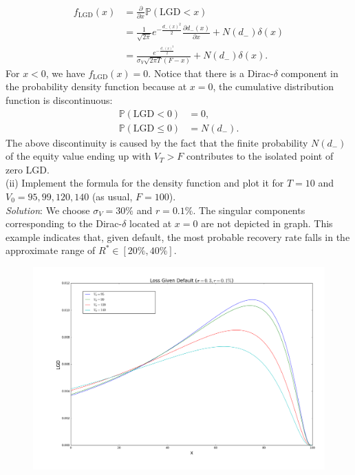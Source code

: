\documentclass[paper=a4, fontsize=11pt]{scrartcl} %
\numberwithin{equation}{section} %
\numberwithin{figure}{section} %
\numberwithin{table}{section} %
\begin{document}
\begin{align}
\nonumber f_{\text{LGD}}(x) &= \frac{\partial}{\partial x}\mathbb{P}\left(\text{LGD}<x\right) \\
\nonumber &= \frac{1}{\sqrt{2\pi}}e^{-\frac{d_-(x)^2}{2}}\frac{\partial d_-(x)}{\partial x}  + N\left(d_-\right)\delta(x)\\
\nonumber &= \frac{e^{-\frac{d_-(x)^2}{2}}}{\sigma_V\sqrt{2\pi T}(F-x)} + N\left(d_-\right)\delta(x).
\end{align} 
For $x<0$, we have $f_{\text{LGD}}(x) = 0$. Notice that there is a Dirac-$\delta$ component in the probability density function because at $x=0$, the cumulative distribution 
function is discontinuous:
\begin{align}
\nonumber \mathbb{P}\left(\text{LGD}<0\right) &=0,\\
\nonumber \mathbb{P}\left(\text{LGD}\le 0\right) & = N(d_-).
\end{align}
The above discontinuity is caused by the fact that the finite probability $N(d_-)$ of the equity value ending up with $V_T>F$ contributes
to the isolated point of zero LGD.\\

(ii) Implement the formula for the density function and plot it for $T = 10
$ and $V_0 = 95, 99, 120, 140$ (as usual, $F = 100$).\\
\textit{Solution}: We choose $\sigma_V = 30\%$ and $r=0.1\%$. The singular components corresponding to the Dirac-$\delta$ 
located at $x=0$ are not depicted in graph. This example indicates that, given default, the most probable recovery rate falls in the approximate range of $R^*\in [20\%, 40\%]$.
\begin{figure}[h]
\includegraphics[width=15cm]{lgd}
\end{figure}
\end{document}
